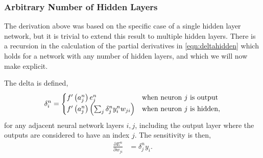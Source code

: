 \documentclass[thesis]{subfiles}
\begin{document}
\subsubsection{Arbitrary Number of Hidden Layers}
\label{arbitraryhidden}
The derivation above was based on the specific case of a single hidden layer network, but it is trivial to extend this result to multiple hidden layers. There is a recursion in the calculation of the partial derivatives in \cref{eqn:deltahidden} which holds for a network with any number of hidden layers, and which we will now make explicit. 

The delta is defined,
\begin{equation}
\delta^n_i = \begin{cases}
        f'\left( a^n_j \right) e^n_j \,& \textrm{when neuron\index{neuron} $j$ is output}\\
        f'\left( a^n_j \right) \left( \sum_j \delta^n_j y^n_i w_{ji} \right)& \textrm{when neuron\index{neuron} $j$ is hidden},
        \end{cases}
\label{eqn:fulldeltadefinition}
\end{equation}
for any adjacent neural network layers $i, j$, including the output layer where the outputs are considered to have an index $j$. The sensitivity is then, 
\begin{equation}
\begin{aligned}
    \frac{\partial E^n}{\partial w_{ji}} &=  \delta^n_j y_i.
     \label{eqn:sensitivity}
\end{aligned}
\end{equation}
%
\end{document}
